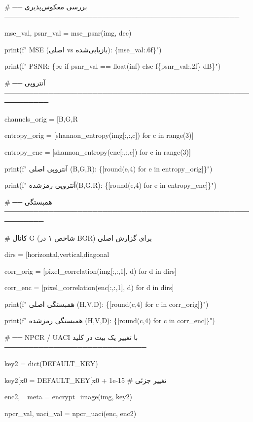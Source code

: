 \# ── بررسی معکوس‌پذیری ────────────────────────────────────────────────

mse\_val, psnr\_val = mse\_psnr(img, dec)

print(f" MSE (اصلی vs بازیابی‌شده): \{mse\_val:.6f\}")

print(f" PSNR: \{\textquotesingle$\infty$\textquotesingle{} if psnr\_val == float(\textquotesingle inf\textquotesingle) else f\textquotesingle\{psnr\_val:.2f\} dB\textquotesingle\}")

\# ── آنتروپی ───────────────────────────────────────────────────────────

channels\_orig = {[}\textquotesingle B\textquotesingle,\textquotesingle G\textquotesingle,\textquotesingle R\textquotesingle{]}

entropy\_orig = {[}shannon\_entropy(img{[}:,:,c{]}) for c in range(3){]}

entropy\_enc = {[}shannon\_entropy(enc{[}:,:,c{]}) for c in range(3){]}

print(f" آنتروپی اصلی (B,G,R): \{{[}round(e,4) for e in entropy\_orig{]}\}")

print(f" آنتروپی رمزشده(B,G,R): \{{[}round(e,4) for e in entropy\_enc{]}\}")

\# ── همبستگی ──────────────────────────────────────────────────────────

\# کانال G (شاخص ۱ در BGR) برای گزارش اصلی

dirs = {[}\textquotesingle horizontal\textquotesingle,\textquotesingle vertical\textquotesingle,\textquotesingle diagonal\textquotesingle{]}

corr\_orig = {[}pixel\_correlation(img{[}:,:,1{]}, d) for d in dirs{]}

corr\_enc = {[}pixel\_correlation(enc{[}:,:,1{]}, d) for d in dirs{]}

print(f" همبستگی اصلی (H,V,D): \{{[}round(c,4) for c in corr\_orig{]}\}")

print(f" همبستگی رمزشده (H,V,D): \{{[}round(c,4) for c in corr\_enc{]}\}")

\# ── NPCR / UACI با تغییر یک بیت در کلید ─────────────────────────────

key2 = dict(DEFAULT\_KEY)

key2{[}\textquotesingle x0\textquotesingle{]} = DEFAULT\_KEY{[}\textquotesingle x0\textquotesingle{]} + 1e-15 \# تغییر جزئی

enc2, \_meta = encrypt\_image(img, key2)

npcr\_val, uaci\_val = npcr\_uaci(enc, enc2)

